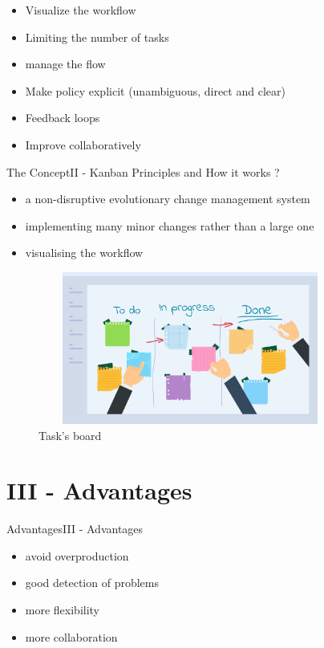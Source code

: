 \documentclass[10pt]{beamer}
\newcommand{\PII}{II - Kanban Principles and How it works ?}
\newcommand{\PIII}{III - Advantages}
\begin{document}
\begin{frame}
    \begin{itemize}
        \item Visualize the workflow
        \item Limiting the number of tasks 
        \item manage the flow
        \item Make policy explicit (unambiguous, direct and clear)
        \item Feedback loops
        \item Improve collaboratively 

    \end{itemize}  
\end{frame}

\begin{frame}{The Concept}{\PII}
    \begin{itemize}
        \item a non-disruptive evolutionary change management system
        \item implementing many minor changes rather than a large one
        \item visualising the workflow
    \end{itemize}
     \begin{figure}
      \centering
   \includegraphics[width=10cm, height=5cm]{ph.png}
      \caption{Task's board}
     \end{figure}
\end{frame}

\section{\PIII} 
\begin{frame}{Advantages}{\PIII}
    \begin{itemize}
        \item avoid overproduction
        \item good detection of problems
        \item more flexibility 
        \item more collaboration
    \end{itemize}

\end{frame}
\end{document}
